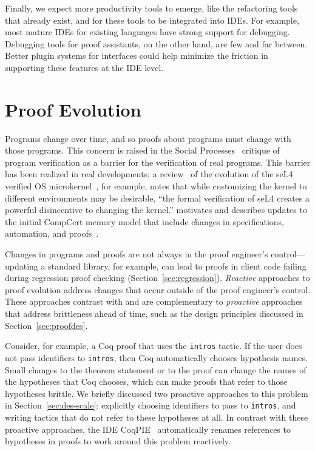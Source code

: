 Finally, we expect more productivity tools to emerge, like the refactoring
tools that already exist, and for these tools to be integrated into IDEs. For example, most mature IDEs for existing languages 
have strong support for debugging. Debugging tools for proof assistants, on the other hand,
are few and far between.
Better plugin systems for interfaces could help minimize the friction in supporting
these features at the IDE level. 

\section{Proof Evolution}
\label{sec:evolve}


Programs change over time, and so proofs about programs must change with those programs.
This concern is raised in the Social Processes~\citep{DeMillo1977} critique of program verification
as a barrier for the verification of real programs. 
This barrier has been realized in real developments; a review~\citep{Elphinstone2013} of the evolution of the seL4 verified 
OS microkernel~\citep{Klein2009}, for example, notes that while
customizing the kernel to different environments may be desirable, 
``the formal verification of seL4 creates a powerful disincentive to changing the kernel.''
\cite{leroy2012} motivates and describes updates to the initial CompCert memory model
that include changes in specifications, automation, and proofs~\citep{leroy-mem-2010}.

Changes in programs and proofs are not always in the proof engineer's control---
updating a standard library, for example, can lead to proofs in client code failing
during regression proof checking (Section~\ref{sec:regression}).
\textit{Reactive} approaches to proof evolution address changes that occur outside of the proof engineer's control.
These approaches contrast with and are complementary to \textit{proactive} approaches
that address brittleness ahead of time, 
such as the design principles discussed in Section~\ref{sec:proofdes}.

Consider, for example, a Coq proof that uses the \lstinline{intros} tactic. If the user does not
pass identifiers to \lstinline{intros}, then Coq automatically chooses hypothesis names. Small changes to the theorem statement or 
to the proof can change the names of the hypotheses that Coq chooses, which can make proofs that refer to those hypotheses brittle.
We briefly discussed two proactive approaches to this problem in Section~\ref{sec:des-scale}:
explicitly choosing identifiers to pass to \lstinline{intros}, and writing tactics that do not refer to these hypotheses at all.
In contrast with these proactive approaches,
the IDE CoqPIE~\citep{Roe2016} automatically renames references to hypotheses in proofs to work
around this problem reactively.


